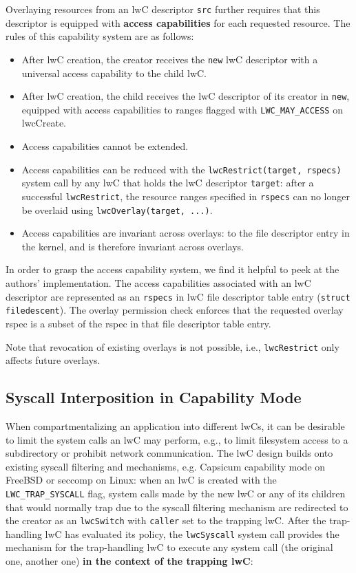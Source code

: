 \documentclass[10pt,twocolumn,letter]{article}
\begin{document}
Overlaying resources from an lwC descriptor \lstinline{src} further requires that this descriptor is equipped with \textbf{access capabilities} for each requested resource.
The rules of this capability system are as follows:
\begin{itemize}
  \item After lwC creation, the creator receives the \lstinline{new} lwC descriptor with a universal access capability to the child lwC.
  \item After lwC creation, the child receives the lwC descriptor of its creator in \lstinline{new}, equipped with access capabilities to ranges flagged with \lstinline{LWC_MAY_ACCESS} on lwcCreate.
  \item Access capabilities cannot be extended.
  \item Access capabilities can be reduced with the \lstinline{lwcRestrict(target, rspecs)} system call by any lwC that holds the lwC descriptor \lstinline{target}:
        after a successful \lstinline{lwcRestrict}, the resource ranges specified in \lstinline{rspecs} can no longer be overlaid using \lstinline{lwcOverlay(target, ...)}.
  \item Access capabilities are invariant across overlays: to the file descriptor entry in the kernel, and is therefore invariant across overlays.
\end{itemize}

In order to grasp the access capability system, we find it helpful to peek at the authors' implementation.
The access capabilities associated with an lwC descriptor are represented as an \lstinline{rspecs} in lwC file descriptor table entry (\lstinline{struct filedescent}).
The overlay permission check enforces that the requested overlay rspec is a subset of the rspec in that file descriptor table entry.

Note that revocation of existing overlays is not possible, i.e., \lstinline{lwcRestrict} only affects future overlays.

\subsection{Syscall Interposition in Capability Mode}\label{design:syscallinterpos}
When compartmentalizing an application into different lwCs, it can be desirable to limit the system calls an lwC may perform, e.g., to limit filesystem access to a subdirectory or prohibit network communication.
The lwC design builds onto existing syscall filtering and mechanisms, e.g. Capsicum capability mode on FreeBSD or seccomp on Linux:
when an lwC is created with the \lstinline{LWC_TRAP_SYSCALL} flag, system calls made by the new lwC or any of its children that would normally trap due to the syscall filtering mechanism are redirected to the creator as an \lstinline{lwcSwitch} with \lstinline{caller} set to the trapping lwC.
After the trap-handling lwC has evaluated its policy, the \lstinline{lwcSyscall} system call provides the mechanism for the trap-handling lwC to execute any system call (the original one, another one) \textbf{in the context of the trapping lwC}:
\end{document}

